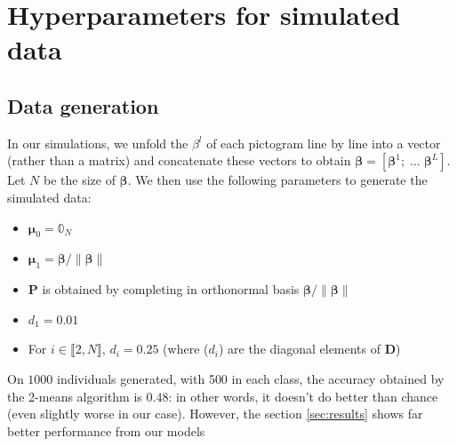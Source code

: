 \documentclass[preprint,12pt]{elsarticle}
\begin{document}



\newpage
  
 



\newpage

\appendix

\section{Hyperparameters for simulated data}
\label{annexe:hyperparam}
\subsection{Data generation}

\noindent In our simulations, we unfold the $\beta^l$ of each pictogram line by line into a vector (rather than a matrix) and concatenate these vectors to obtain $\bm{\beta} = [\bm{\beta}^1; \; \hdots \; \bm{\beta}^L]$. Let $N$ be the size of $\bm{\beta}$. We then use the following parameters to generate the simulated data:
\begin{itemize}[label = $\bullet$]
    \item $\bm{\mu}_0 = \mathbb{0}_N$
    \item $\bm{\mu}_1 = \bm{\beta}/\lVert \bm{\beta}\rVert$ 
    \item $\mathbf{P}$ is obtained by completing in orthonormal basis $\bm{\beta}/\lVert \bm{\beta}\rVert$
    \item $d_1 = 0.01$
    \item For $i \in \llbracket 2, N \rrbracket$, $d_i = 0.25$ (where ($d_i$) are the diagonal elements of $\mathbf{D}$) 
\end{itemize}

On $1000$ individuals generated, with 500 in each class, the accuracy obtained by the 2-means algorithm is $0.48$: in other words, it doesn't do better than chance (even slightly worse in our case). However, the section \ref{sec:results} shows far better performance from our models
\end{document}
